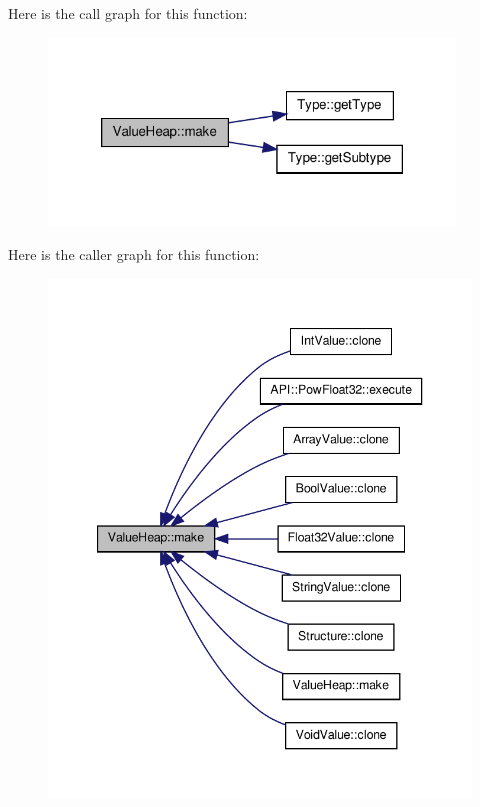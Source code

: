 Here is the call graph for this function\-:
\nopagebreak
\begin{figure}[H]
\begin{center}
\leavevmode
\includegraphics[width=306pt]{class_value_heap_abacb4ffcf601a144308827e27a2dbc12_cgraph}
\end{center}
\end{figure}




Here is the caller graph for this function\-:
\nopagebreak
\begin{figure}[H]
\begin{center}
\leavevmode
\includegraphics[width=344pt]{class_value_heap_abacb4ffcf601a144308827e27a2dbc12_icgraph}
\end{center}
\end{figure}


